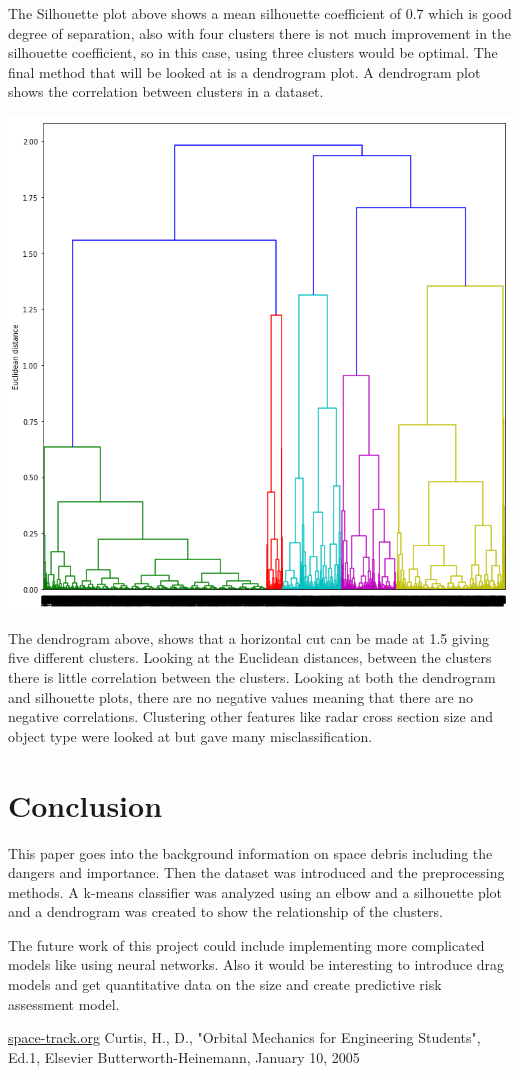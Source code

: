 \documentclass[12pt,a4paper]{article}
\begin{document}
The Silhouette plot above shows a mean silhouette coefficient of 0.7 which is good degree of separation, also with four clusters there is not much improvement in the silhouette coefficient, so in this case, using three clusters would be optimal.
The final method that will be looked at is a dendrogram plot. A dendrogram plot shows the correlation between clusters in a dataset.
\begin{center}
	\includegraphics[scale=0.3]{figures/dendrogram.png}
	\label{fig:dendrogram}
\end{center}
The dendrogram above, shows that a horizontal cut can be made at 1.5 giving five different clusters. Looking at the Euclidean distances, between the clusters there is little correlation between the clusters.  Looking at both the dendrogram and silhouette plots, there are no negative values meaning that there are no negative correlations. Clustering other features like radar cross section size and object type were looked at but gave many misclassification.
\section{Conclusion}
This paper goes into the background information on space debris including the dangers and importance. Then the dataset was introduced and the preprocessing methods. A k-means classifier was analyzed using an elbow and a silhouette plot and a dendrogram was created to show the relationship of the clusters.

The future work of this project could include implementing more complicated models like using neural networks. Also it would be interesting to introduce drag models and get quantitative data on the size and create predictive risk assessment model.

\begin{thebibliography}{5}
 \url{space-track.org}
 Curtis, H., D., "Orbital Mechanics for Engineering Students", Ed.1, Elsevier Butterworth-Heinemann, January 10, 2005
\end{thebibliography}
 
\end{document}

